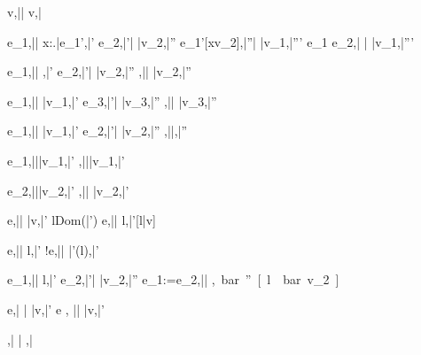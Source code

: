 


  {}
  {v,\bar{\sigma}\bar{\eval} v,\bar{\sigma}}


  {e_1,\bar{\sigma}\bar{\eval} \lambda x:\tau.\bar{e_1'},\bar{\sigma'}\Quad
   e_2,\bar{\sigma'}\bar{\eval} \bar{v_2},\bar{\sigma''}\Quad
   e_1'[x\mapsto v_2],\bar{\sigma''}\bar{\eval} \bar{v_1},\bar{\sigma'''}}
  {e_1 e_2,\bar{\sigma} \bar{\eval} \bar{v_1},\bar{\sigma'''}}


  {e_1,\bar{\sigma}\bar{\eval} \True,\bar{\sigma'}\Quad
   e_2,\bar{\sigma'}\bar{\eval} \bar{v_2},\bar{\sigma''}}
  {,\bar{\sigma}\bar{\eval} \bar{v_2},\bar{\sigma''}}

  {e_1,\bar{\sigma}\bar{\eval} \bar{v_1},\bar{\sigma'} \Quad
   e_3,\bar{\sigma'}\bar{\eval} \bar{v_3},\bar{\sigma''}}
  {,\bar{\sigma}\bar{\eval} \bar{v_3},\bar{\sigma''}}


  {e_1,\bar{\sigma}\bar{\eval} \bar{v_1},\bar{\sigma'} \Quad
   e_2,\bar{\sigma'}\bar{\eval} \bar{v_2},\bar{\sigma''}}
  {,\bar{\sigma}\bar{\eval},\bar{\sigma''}}

  {e_1,\bar{\sigma}\bar{\eval}\bar{v_1},\bar{\sigma'}}
  {\Fst{},\bar{\sigma}\bar{\eval}\bar{v_1},\bar{\sigma'}}

  {e_2,\bar{\sigma}\bar{\eval}\bar{v_2},\bar{\sigma'}}
  {\Snd{},\bar{\sigma}\bar{\eval} \bar{v_2},\bar{\sigma'} }

  {e,\bar{\sigma}\bar{\eval} \bar{v},\bar{\sigma'} \Quad
   l\not\in Dom(\bar{\sigma'})}
  {\Ref e,\bar{\sigma}\bar{\eval} l,\bar{\sigma'}[l\mapsto \bar{v}]}

  {e,\bar{\sigma}\bar{\eval} l,\bar{\sigma'}}
  {!e,\bar{\sigma}\bar{\eval} \bar{\sigma'}(l),\bar{\sigma'}}

  {e_1,\bar{\sigma}\bar{\eval} l,\bar{\sigma'} \Quad
   e_2,\bar{\sigma'}\bar{\eval} \bar{v_2},\bar{\sigma''}}
  {e_1:=e_2,\bar{\sigma}\bar{\eval} \unit,\bar{\sigma''}[l\mapsto \bar{v_2}]}

  {e,\bar{\sigma} \bar{\eval} \bar{v},\bar{\sigma'}}
  {\Edit e , \bar{\sigma}\bar{\eval} \Edit \bar{v},\bar{\sigma'}}

  {}
  {\Enter \tau,\bar{\sigma} \bar{\eval} \Enter \tau,\bar{\sigma}}

